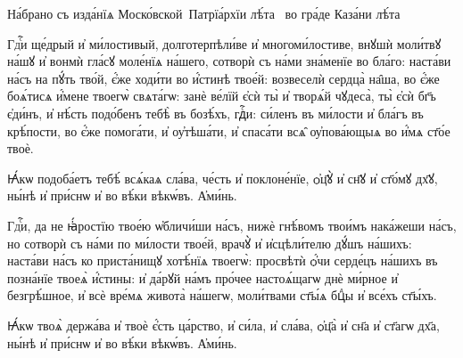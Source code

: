 \documentclass{article}          %
\makeatletter
\def\cu@lettrine{\lettrine[lines=2,findent=0pt,nindent=0pt]}
\def\cuLettrine{\cu@tokenizeletter\cu@lettrine}
\newcommand{\header}[1]{{\LARGE\centering\cuKinovar{#1}\par}}
\makeatother
\begin{document}
\begin{titlepage}
  \centering
  \Huge
  {}
  \vfill
  \Large
  На́брано съ изда́нїѧ Моско́вской~Патрїа́рхїи лѣ́та~ во гра́де Каза́ни лѣ́та~
 \date{}
\end{titlepage}

\pagestyle{cuNum}
\Large             %

\header{На вече́рни}
\vspace{2em}
\vspace{1em}

\begin{center}
\end{center}
\cuLettrine
Гдⷭ҇и ще́дрый и҆ ми́лостивый, долготерпѣли́ве и҆ многоми́лостиве, внꙋшѝ моли́твꙋ на́шꙋ и҆ вонмѝ гла́сꙋ моле́нїѧ на́шего,
сотворѝ съ на́ми зна́менїе во бла́го: наста́ви на́съ на пꙋ́ть тво́й, є҆́же ходи́ти во и҆́стинѣ твое́й: возвеселѝ сердца̀ на̑ша,
во є҆́же боѧ́тисѧ и҆́мене твоегѡ̀ свѧта́гѡ: занѐ ве́лїй є҆сѝ ты̀ и҆ творѧ́й чꙋдеса̀, ты̀ є҆сѝ бг҃ъ є҆ди́нъ, и҆ нѣ́сть подо́бенъ тебѣ̀ въ бозѣ́хъ,
гдⷭ҇и: си́ленъ въ ми́лости и҆ бла́гъ въ крѣ́пости, во є҆́же помога́ти, и҆ оу҆тѣша́ти, и҆ спаса́ти всѧ̑ оу҆пова́ющыѧ во и҆́мѧ ст҃о́е твоѐ.
\par
\cuKinovar Ꙗ҆́кѡ подоба́етъ тебѣ́ всѧ́каѧ сла́ва, че́сть и҆ поклоне́нїе, ѻ҆ц҃ꙋ̀ и҆ сн҃ꙋ и҆ ст҃о́мꙋ дх҃ꙋ, ны́нѣ и҆ при́снѡ и҆ во вѣ́ки вѣкѡ́въ.
\cuKinovar А҆ми́нь.

\begin{center}
\end{center}
\cuLettrine
Гдⷭ҇и, да не ꙗ҆́ростїю твое́ю ѡ҆бличи́ши на́съ, нижѐ гнѣ́вомъ твои́мъ нака́жеши на́съ, но сотворѝ съ на́ми по ми́лости твое́й,
врачꙋ̀ и҆ и҆сцѣли́телю дꙋ́шъ на́шихъ: наста́ви на́съ ко приста́нищꙋ хотѣ́нїѧ твоегѡ̀: просвѣтѝ ѻ҆́чи серде́цъ на́шихъ
въ позна́нїе твоеѧ̀ и҆́стины: и҆ да́рꙋй на́мъ про́чее настоѧ́щагѡ днѐ ми́рное и҆ безгрѣ́шное, и҆ всѐ вре́мѧ живота̀ на́шегѡ,
моли́твами ст҃ы́ѧ бцⷣы и҆ все́хъ ст҃ы́хъ.
\par
\cuKinovar Ꙗ҆́кѡ твоѧ̀ держа́ва и҆ твоѐ є҆́сть ца́рство, и҆ си́ла, и҆ сла́ва, ѻ҆ц҃а̀ и҆ сн҃а и҆ ст҃агѡ дх҃а, ны́нѣ и҆ при́снѡ и҆ во вѣ́ки вѣкѡ́въ.
\cuKinovar А҆ми́нь.
\end{document}
